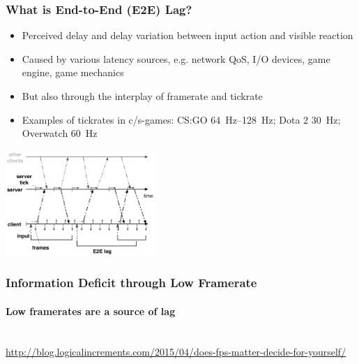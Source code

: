 \documentclass{UDEbeamerEN}
\begin{document}
\begin{frame}
	\frametitle{What is End-to-End (E2E) Lag?}

	\begin{itemize}
		\item Perceived delay and delay variation between input action and visible reaction
		\item Caused by various latency sources, e.g. network QoS, I/O devices, game engine, game mechanics
		\item But also through the interplay of framerate and tickrate
		\item Examples of tickrates in c/s-games: CS:GO \SIrange{64}{128}{\hertz}; Dota 2 \SI{30}{\hertz}; Overwatch \SI{60}{\hertz}
	\end{itemize}

	\pause
	\vspace{-3mm}
	\begin{center}
		\includegraphics[height=4cm]{../../../models/tickrate-timeseries-poster.pdf}
	\end{center}

\end{frame}


\begin{frame}
	\frametitle{Information Deficit through Low Framerate}
	\framesubtitle{Low framerates are a source of lag}

	\begin{center}
		\\
		{\tiny\url{http://blog.logicalincrements.com/2015/04/does-fps-matter-decide-for-yourself/}}
	\end{center}
\end{frame}
\end{document}
